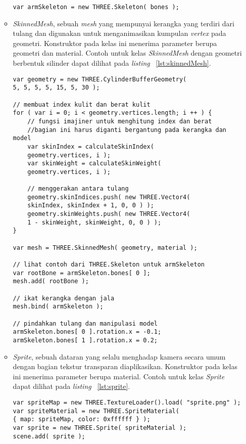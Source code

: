 \begin{itemize}
\begin{itemize}
\begin{lstlisting}[caption={Contoh penggunaan kelas {\it Skeleton}.}, label={lst:skeleton},captionpos=b]
var armSkeleton = new THREE.Skeleton( bones );
\end{lstlisting}
		\item {\it SkinnedMesh}, sebuah {\it mesh} yang mempunyai kerangka yang terdiri dari tulang dan digunakan untuk menganimasikan kumpulan {\it vertex} pada geometri. Konstruktor pada kelas ini menerima parameter berupa geometri dan material. Contoh untuk kelas {\it SkinnedMesh} dengan geometri berbentuk silinder dapat dilihat pada {\it listing} ~\ref{lst:skinnedMesh}.
\begin{lstlisting}[caption={Contoh penggunaan kelas {\it SkinnedMesh}.}, label={lst:skinnedMesh},captionpos=b]
var geometry = new THREE.CylinderBufferGeometry( 
5, 5, 5, 5, 15, 5, 30 );

// membuat index kulit dan berat kulit
for ( var i = 0; i < geometry.vertices.length; i ++ ) {
	// fungsi imajiner untuk menghitung index dan berat
	//bagian ini harus diganti bergantung pada kerangka dan model
	var skinIndex = calculateSkinIndex( 
	geometry.vertices, i );
	var skinWeight = calculateSkinWeight( 
	geometry.vertices, i );

	// menggerakan antara tulang
	geometry.skinIndices.push( new THREE.Vector4( 
	skinIndex, skinIndex + 1, 0, 0 ) );
	geometry.skinWeights.push( new THREE.Vector4(
	1 - skinWeight, skinWeight, 0, 0 ) );
}

var mesh = THREE.SkinnedMesh( geometry, material );

// lihat contoh dari THREE.Skeleton untuk armSkeleton
var rootBone = armSkeleton.bones[ 0 ];
mesh.add( rootBone );

// ikat kerangka dengan jala
mesh.bind( armSkeleton );

// pindahkan tulang dan manipulasi model
armSkeleton.bones[ 0 ].rotation.x = -0.1;
armSkeleton.bones[ 1 ].rotation.x = 0.2;
\end{lstlisting}
		\item {\it Sprite}, sebuah dataran yang selalu menghadap kamera secara umum dengan bagian tekstur transparan diaplikasikan. Konstruktor pada kelas ini menerima parameter berupa material. Contoh untuk kelas {\it Sprite} dapat dilihat pada {\it listing} ~\ref{lst:sprite}.
\begin{lstlisting}[caption={Contoh penggunaan kelas {\it Sprite}.}, label={lst:sprite},captionpos=b]
var spriteMap = new THREE.TextureLoader().load( "sprite.png" );
var spriteMaterial = new THREE.SpriteMaterial( 
{ map: spriteMap, color: 0xffffff } );
var sprite = new THREE.Sprite( spriteMaterial );
scene.add( sprite );
\end{lstlisting}
	\end{itemize}
	

\end{itemize}
